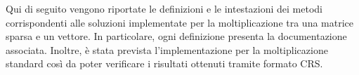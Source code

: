 Qui di seguito vengono riportate le definizioni e le intestazioni dei metodi corrispondenti alle soluzioni implementate per la moltiplicazione tra una matrice sparsa e un vettore. In particolare, ogni definizione presenta la documentazione associata. Inoltre, è stata prevista l'implementazione per la moltiplicazione standard così da poter verificare i risultati ottenuti tramite formato CRS.

